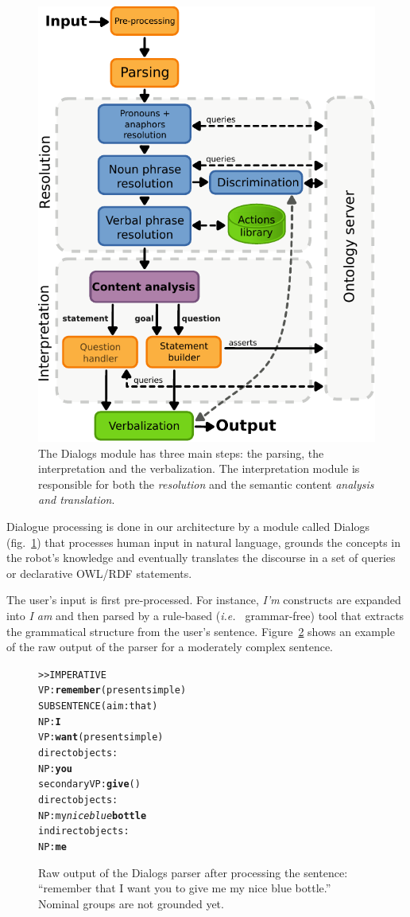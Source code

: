 \documentclass{svmult}
\newcommand{\ie}{{\textit{i.e.~}}}
\begin{document}
\begin{figure}[!t]
\centering
  \includegraphics[width=0.5\linewidth]{figs/dialog_module_simple.pdf}
  \caption{The {\sc Dialogs} module has three main steps: the parsing,
  the interpretation and the verbalization. The interpretation module is
  responsible for both the \emph{resolution} and the semantic content
  \emph{analysis and translation}.} 
  \label{fig|dialog}
\end{figure}

Dialogue processing is done in our architecture by a module called {\sc
Dialogs}\cite{Lemaignan2011b} (fig.~\ref{fig|dialog}) that processes human input in natural
language, grounds the concepts in the robot's knowledge and eventually
translates the discourse in a set of queries or declarative OWL/RDF statements.  

The user's input is first pre-processed. For instance, \emph{I'm} constructs are expanded
into \emph{I am} and then parsed by a rule-based (\ie
grammar-free) tool that extracts the grammatical structure from the user's
sentence. Figure~\ref{dialog|parser_output} shows an example of the raw output of the parser for a moderately complex sentence.

\begin{figure}%
\begin{center}
\scriptsize
\begin{alltt}
>> IMPERATIVE
VP: \textbf{remember} (present simple)
    SUBSENTENCE (aim: that)
      NP: \textbf{I}
      VP: \textbf{want} (present simple)
        direct objects: 
          NP: \textbf{you}
        secondary VP: \textbf{give} ()
              direct objects:
                NP: my \emph{nice blue} \textbf{bottle}
              indirect objects:
                NP: \textbf{me}
\end{alltt}
\end{center}
\caption{Raw output of the {\sc Dialogs} parser after processing the
sentence: ``remember that I want you to give me my nice blue bottle.'' 
Nominal groups are not grounded yet.} 
\label{dialog|parser_output}
\end{figure}
\end{document}
